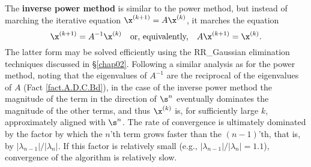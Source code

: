 The {\bf inverse power method} is similar to the power method, but instead of marching the iterative equation $\x^{(k+1)}=A\x^{(k)}$, it marches the equation
\begin{equation}
\x^{(k+1)}=A^{-1}\x^{(k)} \quad \textrm{or, equivalently,} \quad A\x^{(k+1)}=\x^{(k)}.\label{eq.inversepowermethod}
\end{equation}
The latter form may be solved efficiently using the RR_Gaussian elimination techniques discussed in \S \ref{chap02}.
Following a similar analysis as for the power method,
noting that the eigenvalues of $A^{-1}$ are the reciprocal of the eigenvalues of $A$ (Fact \ref{fact.A.D.C.Bd}),
in the case of the inverse power method the magnitude of the term in the direction of $\s^n$
eventually dominates the magnitude of the other terms, and thus $\x^{(k)}$ is, for sufficiently large $k$, approximately aligned with $\s^n$.
The rate of convergence is ultimately dominated by the factor by which the 
$n$'th term grows faster than the $(n-1)$'th, that is, by $|\lambda_{n-1}|/|\lambda_{n}|$.
If this factor is relatively small (e.g., $|\lambda_{n-1}|/|\lambda_{n}|=1.1$), convergence of the algorithm is relatively slow.
\vskip0.1in

